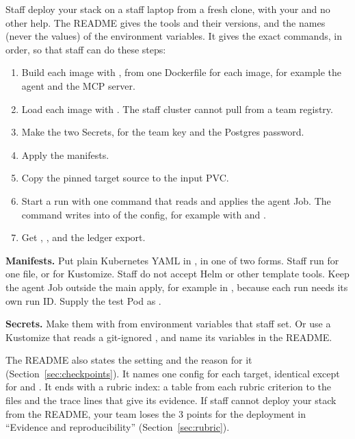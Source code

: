 \documentclass[9pt,letterpaper]{article}
\begin{document}
Staff deploy your stack on a staff laptop from a fresh clone, with your
 and no other help. The README gives the tools and their
versions, and the names (never the values) of the environment variables. It
gives the exact commands, in order, so that staff can do these steps:
\begin{enumerate}
\item Build each image with , from one Dockerfile for each
  image, for example the agent and the MCP server.
\item Load each image with . The staff cluster
  cannot pull from a team registry.
\item Make the two Secrets, for the team key and the Postgres password.
\item Apply the manifests.
\item Copy the pinned target source to the input PVC.
\item Start a run with one command that reads  and applies the
  agent Job. The command writes  into  of the
  config, for example with  and
  .
\item Get , , and the ledger export.
\end{enumerate}

\textbf{Manifests.} Put plain Kubernetes YAML in , in one of two
forms. Staff run  for one file, or
 for Kustomize. Staff do not accept Helm or other
template tools. Keep the agent Job outside the main apply, for example in
, because each run needs its own run ID. Supply the
test Pod as .

\textbf{Secrets.} Make them with  from
environment variables that staff set. Or use a Kustomize 
that reads a git-ignored , and name its variables in the README.

The README also states the  setting and the reason for it
(Section~\ref{sec:checkpoints}). It names one config for each target, identical
except for \code{[scan]} and . It ends with a rubric index: a table from each rubric
criterion to the files and the trace lines that give its evidence. If staff
cannot deploy your stack from the README, your team loses the 3 points for the
deployment in ``Evidence and reproducibility'' (Section~\ref{sec:rubric}).
\end{document}
